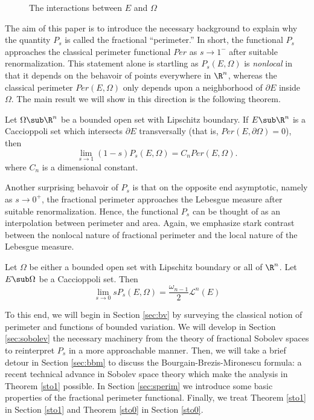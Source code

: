 \documentclass[../main.tex]{subfiles}
\begin{document}
\begin{figure}[H]\label{fig:interactions}
    
    \caption{The interactions between $ E $ and $ \Omega $}
\end{figure}

The aim of this paper is to introduce the necessary background to explain why the quantity $ P_{s} $ is called the fractional ``perimeter.'' In short, the functional $ P_{s} $ approaches the classical perimeter functional $ Per $ as $ s\to1^{-} $ after suitable renormalization. This statement alone is startling as $ P_{s}(E,\Omega) $ is \textit{nonlocal} in that it depends on the behavoir of points everywhere in $ \R^{n} $, whereas the classical perimeter $ Per(E,\Omega) $ only depends upon a neighborhood of $ \partial E $ inside $ \Omega $. The main result we will show in this direction is the following theorem.
\begin{maintheorem}\label{sto1}
    Let $ \Omega\sub \R^{n} $ be a bounded open set with Lipschitz boundary. If $ E\sub \R^{n} $ is a Caccioppoli set which intersects $ \partial E $ transversally (that is, $Per(E, \partial \Omega) = 0$), then
    \begin{equation}
        \lim_{s\to1}(1-s) P_{s}(E, \Omega) = C_{n} Per(E,\Omega).
    \end{equation}
    where $ C_{n} $ is a dimensional constant.
\end{maintheorem}
Another surprising behavoir of $ P_{s} $ is that on the opposite end asymptotic, namely as $ s\to0^{+} $, the fractional perimeter approaches the Lebesgue measure after suitable renormalization. Hence, the functional $ P_{s} $ can be thought of as an interpolation between perimeter and area. Again, we emphasize stark contrast between the nonlocal nature of fractional perimeter and the local nature of the Lebesgue measure.
\begin{maintheorem}\label{sto0}
    Let $ \Omega $ be either a bounded open set with Lipschitz boundary or all of $ \R^{n} $. Let $ E\sub \Omega $ be a Caccioppoli set. Then 
    \begin{equation}
        \lim_{s\to0} sP_{s}(E,\Omega) = \frac{\omega_{n-1}}{2} \mathcal{L}^{n}(E)
    \end{equation}
\end{maintheorem}
To this end, we will begin in Section \ref{sec:bv} by surveying the classical notion of perimeter and functions of bounded variation. We will develop in Section \ref{sec:sobolev} the necessary machinery from the theory of fractional Sobolev spaces to reinterpret $ P_{s} $ in a more approachable manner. Then, we will take a brief detour in Section \ref{sec:bbm} to discuss the Bourgain-Brezis-Mironescu formula: a recent technical advance in Sobolev space theory which make the analysis in Theorem \ref{sto1} possible. In Section \ref{sec:sperim} we introduce some basic properties of the fractional perimeter functional. Finally, we treat Theorem \ref{sto1} in Section \ref{sto1} and Theorem \ref{sto0} in Section \ref{sto0}.
\end{document}
